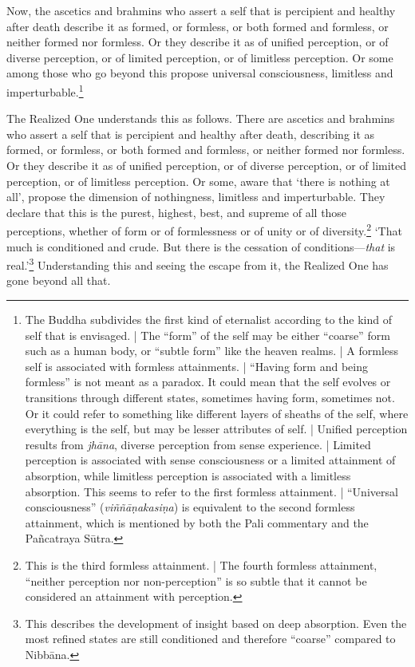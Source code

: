 \documentclass[12pt,openany]{book}%
\begin{document}
Now, the ascetics and brahmins who assert a self that is percipient and healthy after death describe it as formed, or formless, or both formed and formless, or neither formed nor formless. Or they describe it as of unified perception, or of diverse perception, or of limited perception, or of limitless perception. Or some among those who go beyond this propose universal consciousness, limitless and imperturbable.\footnote{The Buddha subdivides the first kind of eternalist according to the kind of self that is envisaged. | The “form” of the self may be either “coarse” form such as a human body, or “subtle form” like the heaven realms. | A formless self is associated with formless attainments. | “Having form and being formless” is not meant as a paradox. It could mean that the self evolves or transitions through different states, sometimes having form, sometimes not. Or it could refer to something like different layers of sheaths of the self, where everything is the self, but may be lesser attributes of self. | Unified perception results from \textit{\textsanskrit{jhāna}}, diverse perception from sense experience. | Limited perception is associated with sense consciousness or a limited attainment of absorption, while limitless perception is associated with a limitless absorption. This seems to refer to the first formless attainment. | “Universal consciousness” (\textit{\textsanskrit{viññāṇakasiṇa}}) is equivalent to the second formless attainment, which is mentioned by both the Pali commentary and the \textsanskrit{Pañcatraya} \textsanskrit{Sūtra}. } 

The Realized One understands this as follows. There are ascetics and brahmins who assert a self that is percipient and healthy after death, describing it as formed, or formless, or both formed and formless, or neither formed nor formless. Or they describe it as of unified perception, or of diverse perception, or of limited perception, or of limitless perception. Or some, aware that ‘there is nothing at all’, propose the dimension of nothingness, limitless and imperturbable. They declare that this is the purest, highest, best, and supreme of all those perceptions, whether of form or of formlessness or of unity or of diversity.\footnote{This is the third formless attainment. | The fourth formless attainment, “neither perception nor non-perception” is so subtle that it cannot be considered an attainment with perception. } ‘That much is conditioned and crude. But there is the cessation of conditions—\emph{that} is real.’\footnote{This describes the development of insight based on deep absorption. Even the most refined states are still conditioned and therefore “coarse” compared to \textsanskrit{Nibbāna}. } Understanding this and seeing the escape from it, the Realized One has gone beyond all that. 
\end{document}
